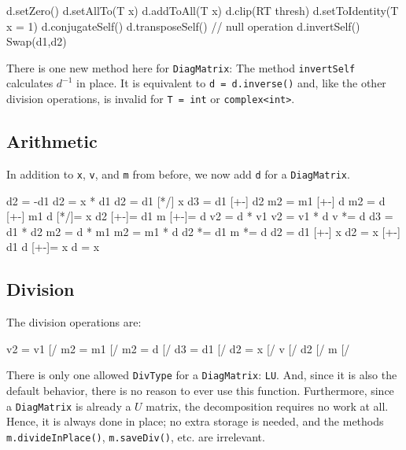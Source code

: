 \documentclass[twoside,letterpaper,11pt]{article}
\renewcommand{\tt}[1]{{\lstinline {#1}}}
\begin{document}
\begin{tmvcode}
d.setZero()
d.setAllTo(T x)
d.addToAll(T x)
d.clip(RT thresh)
d.setToIdentity(T x = 1)
d.conjugateSelf()
d.transposeSelf() // null operation
d.invertSelf()
Swap(d1,d2)
\end{tmvcode}
There is one new method here for \tt{DiagMatrix}: The method \tt{invertSelf}  calculates $d^{-1}$ in place.  
It is equivalent to \tt{d = d.inverse()} and, like the other division operations, is invalid for \tt{T = int} or \tt{complex<int>}.
\vspace{12pt}

\subsection{Arithmetic}
\label{DiagMatrix_Arithmetic}

In addition to \tt{x}, \tt{v}, and \tt{m} from before, we now add \tt{d} for a \tt{DiagMatrix}.

\begin{tmvcode}
d2 = -d1
d2 = x * d1
d2 = d1 [*/] x
d3 = d1 [+-] d2
m2 = m1 [+-] d
m2 = d [+-] m1
d [*/]= x
d2 [+-]= d1
m [+-]= d
v2 = d * v1
v2 = v1 * d
v *= d
d3 = d1 * d2
m2 = d * m1
m2 = m1 * d
d2 *= d1
m *= d
d2 = d1 [+-] x
d2 = x [+-] d1
d [+-]= x
d = x
\end{tmvcode}

\subsection{Division}
\label{DiagMatrix_Division}

The division operations are:
\begin{tmvcode}
v2 = v1 [/%
m2 = m1 [/%
m2 = d [/%
d3 = d1 [/%
d2 = x [/%
v [/%
d2 [/%
m [/%
\end{tmvcode}

There is only one allowed \tt{DivType} for a \tt{DiagMatrix}: \tt{LU}. 
And, since it is also the default behavior,
there is no reason to ever use this function.  Furthermore, since a \tt{DiagMatrix}
is already a $U$ matrix, the decomposition requires no work at all.
Hence, it is always done in place; no extra storage is needed, and 
the methods \tt{m.divideInPlace()}, \tt{m.saveDiv()}, etc. are irrelevant.
\end{document}
